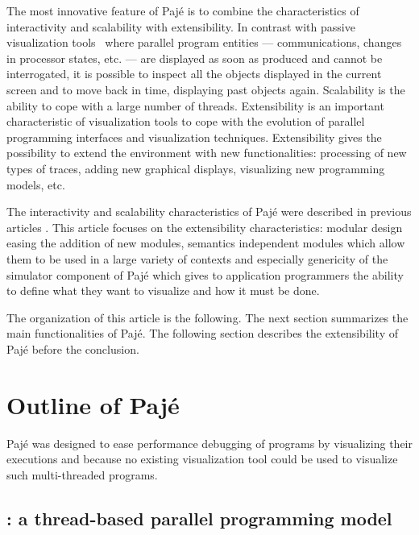 The most innovative feature of Pajé is to combine the characteristics
of interactivity and scalability with extensibility. In contrast with
passive visualization tools~\cite{Heath:1991,pablo} where parallel
program entities --- communications, changes in processor states, etc.
--- are displayed as soon as produced and cannot be interrogated, it
is possible to inspect all the objects displayed in the current screen
and to move back in time, displaying past objects again. Scalability
is the ability to cope with a large number of threads. Extensibility
is an important characteristic of visualization tools to cope with the
evolution of parallel programming interfaces and visualization
techniques. Extensibility gives the possibility to extend the
environment with new functionalities: processing of new types of
traces, adding new graphical displays, visualizing new programming
models, etc.

The interactivity and scalability characteristics of Pajé were
described in previous articles
\cite{ChassinS00,ChassinS:2000a,SteinC98}.  This article focuses on
the extensibility characteristics: modular design easing the addition
of new modules, semantics independent modules which allow them to be
used in a large variety of contexts and especially genericity of the
simulator component of Pajé which gives to application programmers the
ability to define what they want to visualize and how it must be done.

The organization of this article is the following. The next section
summarizes the main functionalities of Pajé.  The following section
describes the extensibility of Pajé before the conclusion.


\section{Outline of Pajé}
\label{sec:Pajé}

Pajé was designed to ease performance debugging of \ath programs by
visualizing their executions and because no existing visualization
tool could be used to visualize such multi-threaded programs.

\subsection{\ath: a thread-based parallel programming model}
\label{sec:ath}

